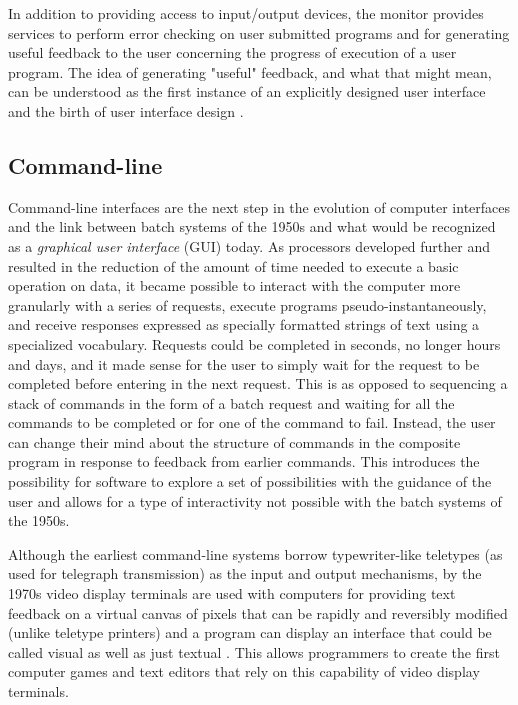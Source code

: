 In addition to providing access to input/output devices, the monitor provides services to perform error checking on user submitted programs and for generating useful feedback to the user concerning the progress of execution of a user program. The idea of generating "useful" feedback, and what that might mean, can be understood as the first instance of an explicitly designed user interface and the birth of user interface design \cite{unix2008}.

\subsection{Command-line}

Command-line interfaces are the next step in the evolution of computer interfaces and the link between batch systems of the 1950s and what would be recognized as a \emph{graphical user interface} (GUI) today. As processors developed further and resulted in the reduction of the amount of time needed to execute a basic operation on data, it became possible to interact with the computer more granularly with a series of requests, execute programs pseudo-instantaneously, and receive responses expressed as specially formatted strings of text using a specialized vocabulary. Requests could be completed in seconds, no longer hours and days, and it made sense for the user to simply wait for the request to be completed before entering in the next request. This is as opposed to sequencing a stack of commands in the form of a batch request and waiting for all the commands to be completed or for one of the command to fail. Instead, the user can change their mind about the structure of commands in the composite program in response to feedback from earlier commands. This introduces the possibility for software to explore a set of possibilities with the guidance of the user and allows for a type of interactivity not possible with the batch systems of the 1950s. 

Although the earliest command-line systems borrow typewriter-like teletypes (as used for telegraph transmission) as the input and output mechanisms, by the 1970s video display terminals are used with computers for providing text feedback on a virtual canvas of pixels that can be rapidly and reversibly modified (unlike teletype printers) and a program can display an interface that could be called visual as well as just textual \cite{unix2008}. This allows programmers to create the first computer games and text editors that rely on this capability of video display terminals.

